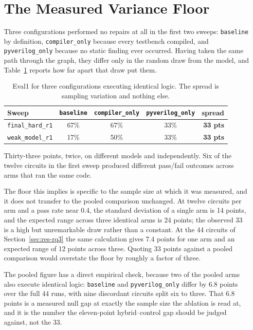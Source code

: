 \documentclass[11pt,a4paper,titlepage=false]{scrreprt}
\begin{document}
\section{The Measured Variance Floor}\label{sec:res-variance}

Three configurations performed no repairs at all in the first two sweeps:
\texttt{baseline} by definition, \texttt{compiler\_only} because every testbench compiled,
and \texttt{pyverilog\_only} because no static finding ever occurred. Having taken the same
path through the graph, they differ only in the random draw from the model, and
Table~\ref{tab:variance} reports how far apart that draw put them.

\begin{table}[H]
\centering
\small
\begin{tabular}{@{}l c c c r@{}}
\toprule
\textbf{Sweep} & \texttt{baseline} & \texttt{compiler\_only} & \texttt{pyverilog\_only} & \textbf{spread} \\
\midrule
\texttt{final\_hard\_r1} & 67\% & 67\% & 33\% & \textbf{33 pts} \\
\texttt{weak\_model\_r1} & 17\% & 50\% & 33\% & \textbf{33 pts} \\
\bottomrule
\end{tabular}
\caption{Eval1 for three configurations executing identical logic. The spread is
sampling variation and nothing else.}
\label{tab:variance}
\end{table}

Thirty-three points, twice, on different models and independently. Six of the twelve
circuits in the first sweep produced different pass/fail outcomes across arms that ran the
same code.

The floor this implies is specific to the sample size at which it was measured, and it does
not transfer to the pooled comparison unchanged. At twelve circuits per arm and a pass rate
near 0.4, the standard deviation of a single arm is 14 points, and the expected range across
three identical arms is 24 points; the observed 33 is a high but unremarkable draw rather
than a constant. At the 44 circuits of Section~\ref{sec:res-rq3} the same calculation gives
7.4 points for one arm and an expected range of 12 points across three. Quoting 33 points
against a pooled comparison would overstate the floor by roughly a factor of three.

The pooled figure has a direct empirical check, because two of the pooled arms also execute
identical logic: \texttt{baseline} and \texttt{pyverilog\_only} differ by 6.8 points over
the full 44 runs, with nine discordant circuits split six to three. That 6.8 points is a
measured null gap at exactly the sample size the ablation is read at, and it is the number
the eleven-point hybrid--control gap should be judged against, not the 33.
\end{document}
